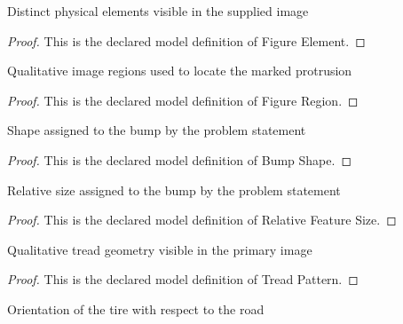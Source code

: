 \begin{definition}
  \label{def:physics:phyx-mini-0225:phyxminiproblems-problemphyxmini0225-figureelement}
  Distinct physical elements visible in the supplied image
\end{definition}
\begin{proof}
  This is the declared model definition of Figure Element.
\end{proof}
\begin{definition}
  \label{def:physics:phyx-mini-0225:phyxminiproblems-problemphyxmini0225-figureregion}
  Qualitative image regions used to locate the marked protrusion
\end{definition}
\begin{proof}
  This is the declared model definition of Figure Region.
\end{proof}
\begin{definition}
  \label{def:physics:phyx-mini-0225:phyxminiproblems-problemphyxmini0225-bumpshape}
  Shape assigned to the bump by the problem statement
\end{definition}
\begin{proof}
  This is the declared model definition of Bump Shape.
\end{proof}
\begin{definition}
  \label{def:physics:phyx-mini-0225:phyxminiproblems-problemphyxmini0225-relativefeaturesize}
  Relative size assigned to the bump by the problem statement
\end{definition}
\begin{proof}
  This is the declared model definition of Relative Feature Size.
\end{proof}
\begin{definition}
  \label{def:physics:phyx-mini-0225:phyxminiproblems-problemphyxmini0225-treadpattern}
  Qualitative tread geometry visible in the primary image
\end{definition}
\begin{proof}
  This is the declared model definition of Tread Pattern.
\end{proof}
\begin{definition}
  \label{def:physics:phyx-mini-0225:phyxminiproblems-problemphyxmini0225-tireorientation}
  Orientation of the tire with respect to the road
\end{definition}
